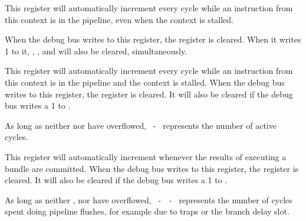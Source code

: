 
This register will automatically increment every cycle while an instruction from
this context is in the pipeline, even when the context is stalled.

When the debug bus writes to this register, the register is cleared. When it
writes 1 to it, , ,  and  will also be
cleared, simultaneously.

\implementation{}


This register will automatically increment every cycle while an instruction from 
this context is in the pipeline and the context is stalled. When the debug bus 
writes to this register, the register is cleared. It will also be cleared if the 
debug bus writes a 1 to .

As long as neither  nor  have overflowed,
~-~ represents the number of active cycles.

\implementation{}


This register will automatically increment whenever the results of executing a 
bundle are committed. When the debug bus writes to this register, the register 
is cleared. It will also be cleared if the debug bus writes a 1 to .

As long as neither ,  nor  have overflowed,
~-~~-~ represents the number of cycles spent
doing pipeline flushes, for example due to traps or the branch delay slot.

\implementation{}

